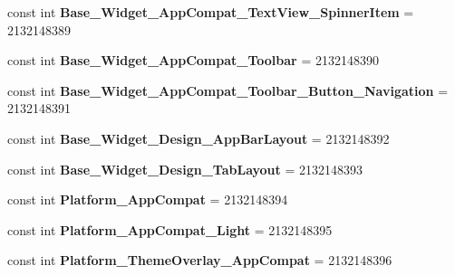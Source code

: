\begin{DoxyCompactItemize}
\mbox{\label{classst_delivery_1_1_resource_1_1_style_a2c5f5d8ef7df6a8c933b178977e4b873}} 
const int {\bfseries Base\+\_\+\+Widget\+\_\+\+App\+Compat\+\_\+\+Text\+View\+\_\+\+Spinner\+Item} = 2132148389
\item 
\mbox{\label{classst_delivery_1_1_resource_1_1_style_a138331a3ba96105aa877b7db1eae37e2}} 
const int {\bfseries Base\+\_\+\+Widget\+\_\+\+App\+Compat\+\_\+\+Toolbar} = 2132148390
\item 
\mbox{\label{classst_delivery_1_1_resource_1_1_style_a552d0cb9e954391bc842b1987c301d32}} 
const int {\bfseries Base\+\_\+\+Widget\+\_\+\+App\+Compat\+\_\+\+Toolbar\+\_\+\+Button\+\_\+\+Navigation} = 2132148391
\item 
\mbox{\label{classst_delivery_1_1_resource_1_1_style_a6e8532e3e8e489a2bea1d1cff5a0f76f}} 
const int {\bfseries Base\+\_\+\+Widget\+\_\+\+Design\+\_\+\+App\+Bar\+Layout} = 2132148392
\item 
\mbox{\label{classst_delivery_1_1_resource_1_1_style_a28903cdc1a48c64d4c1a1903a89e7020}} 
const int {\bfseries Base\+\_\+\+Widget\+\_\+\+Design\+\_\+\+Tab\+Layout} = 2132148393
\item 
\mbox{\label{classst_delivery_1_1_resource_1_1_style_a5c5fa196b54b18bf0cb9660898de187b}} 
const int {\bfseries Platform\+\_\+\+App\+Compat} = 2132148394
\item 
\mbox{\label{classst_delivery_1_1_resource_1_1_style_a7b6fb88a6b4fe8180516f3976da44ee3}} 
const int {\bfseries Platform\+\_\+\+App\+Compat\+\_\+\+Light} = 2132148395
\item 
\mbox{\label{classst_delivery_1_1_resource_1_1_style_a1a8ccec935f11395d91a91c363a42ac0}} 
const int {\bfseries Platform\+\_\+\+Theme\+Overlay\+\_\+\+App\+Compat} = 2132148396
\item 
\mbox{\label{classst_delivery_1_1_resource_1_1_style_a440d8277a3712f991eea0edd68a37c60}} 

\end{DoxyCompactItemize}
